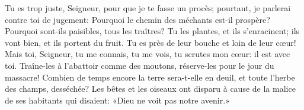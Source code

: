 Tu es trop juste, Seigneur, pour que je te fasse un procès;
	pourtant, je parlerai contre toi de jugement:
	Pourquoi le chemin des méchants est-il prospère?
	Pourquoi sont-ils paisibles, tous les traîtres?
Tu les plantes, et ils s’enracinent; ils vont bien, et ils portent du fruit.
	Tu es près de leur bouche et loin de leur cœur!
Mais toi, Seigneur, tu me connais, tu me vois, tu scrutes mon cœur:
	il est avec toi.
Traîne-les à l’abattoir comme des moutons, réserve-les pour le jour du massacre!
Combien de temps encore la terre sera-t-elle en deuil,
	et toute l’herbe des champs, desséchée?
	Les bêtes et les oiseaux ont disparu à cause de la malice de ses habitants
	qui disaient: «Dieu ne voit pas notre avenir.»
